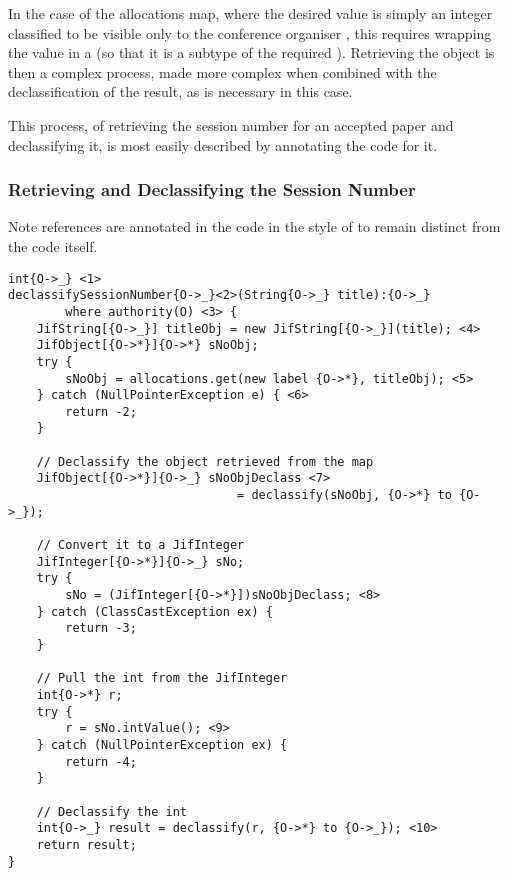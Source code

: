 In the case of the allocations map, where the desired value is simply an integer classified to be visible only to the conference organiser , this requires wrapping the value in a  (so that it is a subtype of the required ). Retrieving the object is then a complex process, made more complex when combined with the declassification of the result, as is necessary in this case.

This process, of retrieving the session number for an accepted paper and declassifying it, is most easily described by annotating the code for it.

\subsubsection{Retrieving and Declassifying the Session Number} \label{cs_conf_jif_retrieval}
%


Note references are annotated in the code in the style of  to remain distinct from the code itself.

\begin{verbatim}
int{O->_} <1> 
declassifySessionNumber{O->_}<2>(String{O->_} title):{O->_} 
		where authority(O) <3> {
	JifString[{O->_}] titleObj = new JifString[{O->_}](title); <4>
	JifObject[{O->*}]{O->*} sNoObj;
	try {
		sNoObj = allocations.get(new label {O->*}, titleObj); <5>
	} catch (NullPointerException e) { <6>
		return -2;
	}
	
	// Declassify the object retrieved from the map
	JifObject[{O->*}]{O->_} sNoObjDeclass <7> 
								= declassify(sNoObj, {O->*} to {O->_});
	
	// Convert it to a JifInteger
	JifInteger[{O->*}]{O->_} sNo;
	try {
		sNo = (JifInteger[{O->*}])sNoObjDeclass; <8>
	} catch (ClassCastException ex) {
		return -3;
	}
		
	// Pull the int from the JifInteger
	int{O->*} r;
	try {
		r = sNo.intValue(); <9>
	} catch (NullPointerException ex) {
		return -4;
	}
	
	// Declassify the int
	int{O->_} result = declassify(r, {O->*} to {O->_}); <10>
	return result;
}
\end{verbatim}

